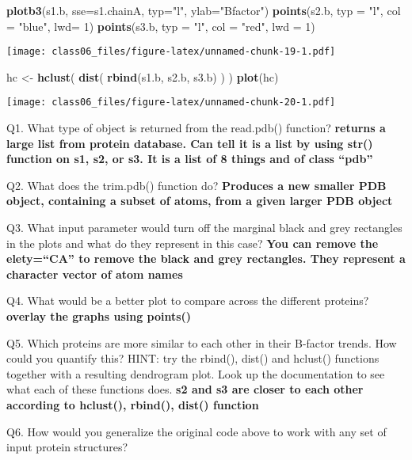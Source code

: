 \documentclass[
]{article}
\newenvironment{Shaded}{\begin{snugshade}}{\end{snugshade}}
\newcommand{\DataTypeTok}[1]{\textcolor[rgb]{0.13,0.29,0.53}{#1}}
\newcommand{\DecValTok}[1]{\textcolor[rgb]{0.00,0.00,0.81}{#1}}
\newcommand{\KeywordTok}[1]{\textcolor[rgb]{0.13,0.29,0.53}{\textbf{#1}}}
\newcommand{\NormalTok}[1]{#1}
\newcommand{\StringTok}[1]{\textcolor[rgb]{0.31,0.60,0.02}{#1}}
\begin{document}
\begin{Shaded}
\begin{Highlighting}[]
\KeywordTok{plotb3}\NormalTok{(s1.b, }\DataTypeTok{sse=}\NormalTok{s1.chainA, }\DataTypeTok{typ=}\StringTok{"l"}\NormalTok{, }\DataTypeTok{ylab=}\StringTok{"Bfactor"}\NormalTok{)}
\KeywordTok{points}\NormalTok{(s2.b, }\DataTypeTok{typ =} \StringTok{"l"}\NormalTok{, }\DataTypeTok{col =} \StringTok{"blue"}\NormalTok{, }\DataTypeTok{lwd=} \DecValTok{1}\NormalTok{)}
\KeywordTok{points}\NormalTok{(s3.b, }\DataTypeTok{typ =} \StringTok{"l"}\NormalTok{, }\DataTypeTok{col =} \StringTok{"red"}\NormalTok{, }\DataTypeTok{lwd =} \DecValTok{1}\NormalTok{)}
\end{Highlighting}
\end{Shaded}

\texttt{[image: class06\_files/figure-latex/unnamed-chunk-19-1.pdf]}

\begin{Shaded}
\begin{Highlighting}[]
\NormalTok{hc <-}\StringTok{ }\KeywordTok{hclust}\NormalTok{( }\KeywordTok{dist}\NormalTok{( }\KeywordTok{rbind}\NormalTok{(s1.b, s2.b, s3.b) ) )}
\KeywordTok{plot}\NormalTok{(hc)}
\end{Highlighting}
\end{Shaded}

\texttt{[image: class06\_files/figure-latex/unnamed-chunk-20-1.pdf]}

Q1. What type of object is returned from the read.pdb() function?
\textbf{returns a large list from protein database. Can tell it is a
list by using str() function on s1, s2, or s3. It is a list of 8 things
and of class ``pdb''}

Q2. What does the trim.pdb() function do? \textbf{Produces a new smaller
PDB object, containing a subset of atoms, from a given larger PDB
object}

Q3. What input parameter would turn off the marginal black and grey
rectangles in the plots and what do they represent in this case?
\textbf{You can remove the elety=``CA'' to remove the black and grey
rectangles. They represent a character vector of atom names}

Q4. What would be a better plot to compare across the different
proteins? \textbf{overlay the graphs using points()}

Q5. Which proteins are more similar to each other in their B-factor
trends. How could you quantify this? HINT: try the rbind(), dist() and
hclust() functions together with a resulting dendrogram plot. Look up
the documentation to see what each of these functions does. \textbf{s2
and s3 are closer to each other according to hclust(), rbind(), dist()
function }

Q6. How would you generalize the original code above to work with any
set of input protein structures?
\end{document}

